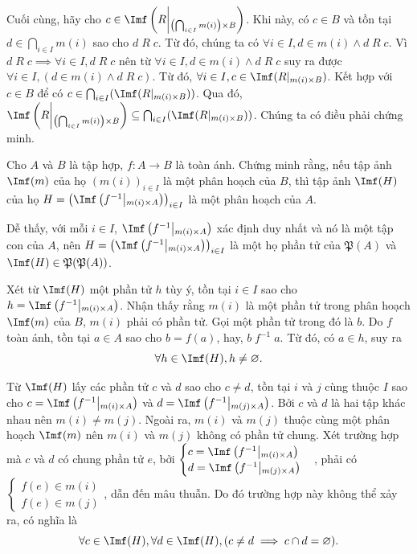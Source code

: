 Cuối cùng, hãy cho $c \in \Imf\left(R \middle|_{\left(\bigcap_{i \in I}m(i)\right) \times B}\right)$. Khi này, có $c \in B$ và tồn tại $d \in \bigcap_{i \in I}m(i)$ sao cho $d\;R\;c$. Từ đó, chúng ta có $\forall i \in I, d \in m(i) \land d\;R\;c$. Vì $d\;R\;c \implies \forall i \in I, d\;R\;c$ nên từ $\forall i \in I, d \in m(i) \land d\;R\;c$ suy ra được $\forall i \in I, (d \in m(i) \land d\;R\;c).$
Từ đó, $\forall i \in I, c \in \Imf(R|_{m(i) \times B})$. Kết hợp với $c \in B$ để có $c \in \bigcap_{i \in I}(\Imf(R|_{m(i) \times B}))$. Qua đó, $\Imf \left(R\middle|_{\left(\bigcap_{i \in I}m(i)\right) \times B} \right)\subseteq \bigcap_{i \in I}(\Imf(R|_{m(i) \times B}))$. Chúng ta có điều phải chứng minh.

\exercise Cho $A$ và $B$ là tập hợp, $f : A \to B$ là toàn ánh. Chứng minh rằng, nếu tập ảnh $\Imf(m)$ của họ $(m(i))_{i \in I}$ là một phân hoạch của $B$, thì tập ảnh $\Imf(H)$ của họ $H = \left(\Imf\left(f^{-1}\middle|_{m(i) \times A}\right)\right)_{i \in I}$ là một phân hoạch của $A$.

\solution 

Dễ thấy, với mỗi $i \in I$, $\Imf\left(f^{-1}\middle|_{m(i) \times A}\right)$ xác định duy nhất và nó là một tập con của $A$, nên $H = \left(\Imf\left(f^{-1}\middle|_{m(i) \times A}\right)\right)_{i \in I}$ là một họ phần tử của $\mathfrak{P}(A)$ và $\Imf(H) \in \mathfrak{P}(\mathfrak{P}(A))$.

Xét từ $\Imf(H)$ một phần tử $h$ tùy ý, tồn tại $i \in I$ sao cho $h = \Imf\left(f^{-1}\middle|_{m(i) \times A}\right)$. Nhận thấy rằng $m(i)$ là một phần tử trong phân hoạch $\Imf(m)$ của $B$, $m(i)$ phải có phần tử. Gọi một phần tử trong đó là $b$. Do $f$ toàn ánh, tồn tại $a \in A$ sao cho $b = f(a)$, hay, $b\;f^{-1}\;a$. Từ đó, có $a \in h$, suy ra \begin{equation*}
   \forall h \in \Imf(H), h \neq \varnothing.
\end{equation*}

Từ $\Imf(H)$ lấy các phần tử $c$ và $d$ sao cho $c \neq d$, tồn tại $i$ và $j$ cùng thuộc $I$ sao cho $c = \Imf\left(f^{-1}\middle|_{m(i) \times A}\right)$ và $d = \Imf\left(f^{-1}\middle|_{m(j) \times A}\right)$. Bởi $c$ và $d$ là hai tập khác nhau nên $m(i) \neq m(j)$. Ngoài ra, $m(i)$ và $m(j)$ thuộc cùng một phân hoạch $\Imf(m)$ nên $m(i)$ và $m(j)$ không có phần tử chung. Xét trường hợp mà $c$ và $d$ có chung phần tử $e$, bởi $
   \begin{cases}
      c = \Imf\left(f^{-1}\middle|_{m(i) \times A}\right) \\
      d = \Imf\left(f^{-1}\middle|_{m(j) \times A}\right)
   \end{cases}
$, phải có $\begin{cases}
   f(e) \in m(i) \\
   f(e) \in m(j)
\end{cases}$, dẫn đến mâu thuẫn. Do đó trường hợp này không thể xảy ra, có nghĩa là \begin{equation*}
   \forall c \in \Imf(H), \forall d \in \Imf(H), (c \neq d \implies c \cap d = \varnothing).
\end{equation*}

